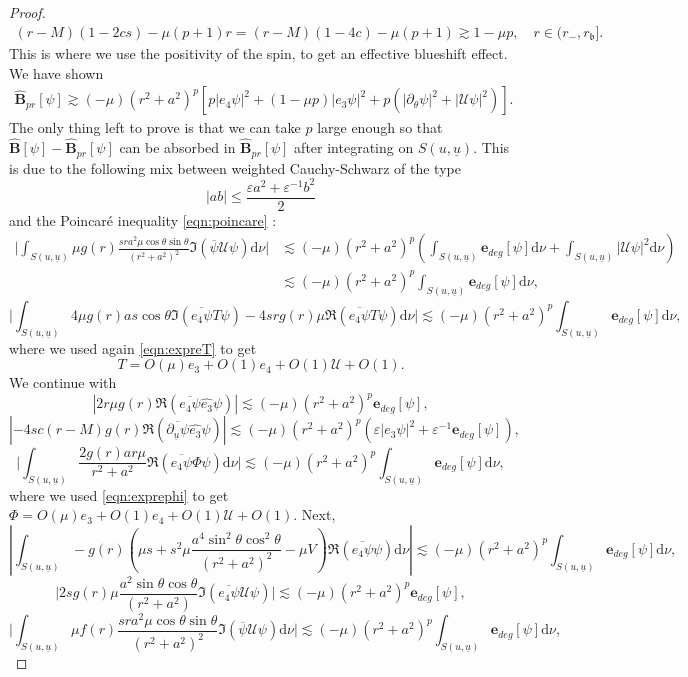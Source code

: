 \documentclass[reqno]{amsart}
\numberwithin{equation}{section}
\newcommand{\intS}{\int_{S(u,\ubar)}}
\newcommand{\Real}{\mathfrak{R}}
\newcommand{\ubar}{{\underline{u}}}
\newcommand{\dee}{\mathrm{d}}
\newcommand{\ener}{\mathbf{e}}
\newcommand{\ethat}{\widehat{e_3}}
\newcommand{\rb}{r_\mathfrak{b}}
\theoremstyle{plain}
\theoremstyle{definition}
\theoremstyle{remark}
\numberwithin{equation}{section}
\begin{document}
\begin{proof}
\begin{align}
    (r-M)(1-2cs)-\mu(p+1) r=(r-M)(1-4c)-\mu(p+1)\gtrsim 1-\mu p,\quad r\in(r_-,\rb].
\end{align}
This is where we use the positivity of the spin, to get an effective blueshift effect. We have shown 
\begin{align}\label{eqn:bprhat}
    \widehat{\mathbf{B}}_{pr}[\psi]\gtrsim (-\mu)(r^2+a^2)^p[p|e_4\psi|^2+(1-\mu p)|e_3\psi|^2+p(|\partial_\theta\psi|^2+|\mathcal{U}\psi|^2)].
\end{align}
The only thing left to prove is that we can take $p$ large enough so that $\widehat{\mathbf{B}}[\psi]-\widehat{\mathbf{B}}_{pr}[\psi]$ can be absorbed in $\widehat{\mathbf{B}}_{pr}[\psi]$ after integrating on ${S(u,\ubar)}$. This is due to the following mix between weighted Cauchy-Schwarz of the type 
$$|ab|\leq\frac{\varepsilon a^2+\varepsilon^{-1}b^2}{2}$$
and the Poincaré inequality \eqref{eqn:poincare} :
\begin{align*}
    \Bigg|\intS \mu g(r)\frac{sra^2\mu\cos\theta\sin\theta}{(r^2+a^2)^2}\mathfrak{I}(\overline{\psi} \mathcal{U}\psi)\dee\nu\Bigg|&\lesssim (-\mu)(r^2+a^2)^p\left(\intS\ener_{deg}[\psi]\dee\nu+\intS|\mathcal{U}\psi|^2\dee\nu\right)\\
    &\lesssim(-\mu)(r^2+a^2)^p\intS\ener_{deg}[\psi]\dee\nu,
\end{align*}
$$\Bigg|\intS4\mu g(r)as\cos\theta\mathfrak{I}(\overline{e_4\psi}T\psi)-4srg(r)\mu\mathfrak{R}(\overline{e_4\psi}T\psi)\dee\nu\Bigg|\lesssim(-\mu)(r^2+a^2)^p\intS\ener_{deg}[\psi]\dee\nu,$$
where we used again \eqref{eqn:expreT} to get
$$T=O(\mu)e_3+O(1)e_4+O(1)\mathcal{U}+O(1).$$
We continue with 
$$|2r\mu g(r)\mathfrak{R}(\overline{e_4\psi}\ethat\psi)|\lesssim(-\mu)(r^2+a^2)^p\ener_{deg}[\psi],$$
$$|-4sc(r-M)g(r)\Real(\overline{\partial_\ubar\psi}\ethat\psi)|\lesssim (-\mu)(r^2+a^2)^p(\varepsilon|e_3\psi|^2+\varepsilon^{-1}\ener_{deg}[\psi]),$$
$$\Bigg|\intS\dfrac{2g(r)ar\mu}{r^2+a^2}\mathfrak{R}(\overline{e_4\psi}\Phi\psi)\dee\nu\Bigg|\lesssim(-\mu)(r^2+a^2)^p\intS\ener_{deg}[\psi]\dee\nu,$$
where we used \eqref{eqn:exprephi} to get $\Phi=O(\mu)e_3+O(1)e_4+O(1)\mathcal{U}+O(1)$. Next, 
$$\left|\intS-g(r)\left(\mu s+s^2\mu\dfrac{a^4\sin^2\theta\cos^2\theta}{(r^2+a^2)^2}-\mu V\right)\mathfrak{R}(\overline{e_4\psi}\psi)\dee\nu\right|\lesssim(-\mu)(r^2+a^2)^p\intS\ener_{deg}[\psi]\dee\nu,$$
$$\Bigg|2sg(r)\mu\dfrac{a^2\sin\theta\cos\theta}{(r^2+a^2)}\mathfrak{I}(\overline{e_4\psi}\mathcal{U}\psi)\Bigg|\lesssim(-\mu)(r^2+a^2)^p\ener_{deg}[\psi],$$
$$\Bigg|\intS\mu f(r)\frac{sra^2\mu\cos\theta\sin\theta}{(r^2+a^2)^2}\mathfrak{I}(\overline{\psi} \mathcal{U}\psi)\dee\nu\Bigg|\lesssim(-\mu)(r^2+a^2)^p\intS\ener_{deg}[\psi]\dee\nu,$$

\end{proof}
\end{document}

